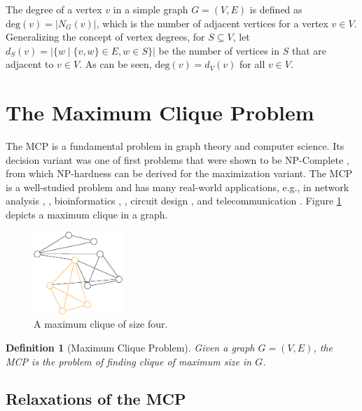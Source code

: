 \documentclass[draft,final]{vutinfth} %
\newtheorem{definition}{Definition}[section]
\begin{document}
The degree of a vertex $v$ in a simple graph $G = (V,E)$ is defined as $\mathrm{deg}(v) = |N_G(v)|$, which is the number of adjacent vertices for a vertex $v \in V$. Generalizing the concept of vertex degrees, for $S \subseteq V$, let $d_S(v) = |\{w \mid \{v,w\} \in E, w \in S\}|$ be the number of vertices in $S$ that are adjacent to $v \in V$. As can be seen, $\mathrm{deg}(v) = d_V(v) $ for all $v \in V$. 


\section{The Maximum Clique Problem}\label{sec:mcp}

The MCP is a fundamental problem in graph theory and computer science. Its decision variant was one of first problems that were shown to be NP-Complete \cite{Karp1972}, from which NP-hardness can be derived for the maximization variant. The MCP is a well-studied problem and has many real-world applications, e.g., in network analysis \cite{Fortunato09}, \cite{Palla2005}, bioinformatics \cite{Depolli2013}, \cite{BUTENKO20061}, circuit design \cite{LeckyMA89}, and telecommunication \cite{DouikSAA14}. 
Figure \ref{fig:maxclique} depicts a maximum clique in a graph. 
\begin{figure}
    \centering
    \includegraphics[width=0.3\textwidth]{graphics/graph1-clique.eps}
    \caption{A maximum clique of size four.}
    \label{fig:maxclique}
\end{figure}

\begin{definition}[Maximum Clique Problem]
	\label{def:mcp}
	Given a graph $G = (V,E)$, the MCP is the problem of finding clique of maximum size in $G$. 
\end{definition}

\subsection{Relaxations of the MCP}
\end{document}
